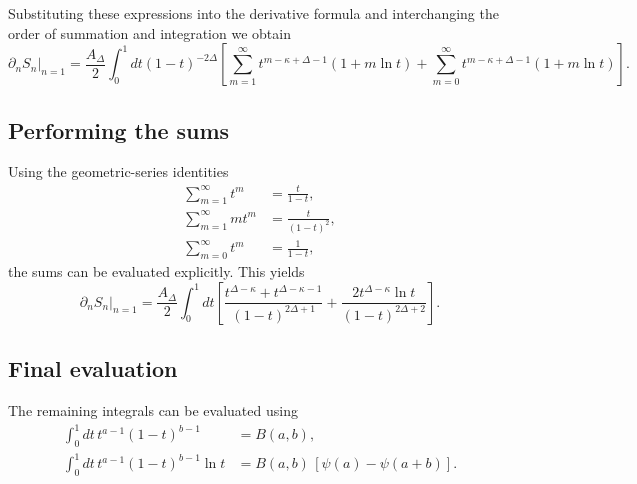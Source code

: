 \documentclass[11pt]{article}
\begin{document}
Substituting these expressions into the derivative formula and
interchanging the order of summation and integration we obtain
\begin{equation}
\partial_n S_n\big|_{n=1}=
\frac{A_\Delta}{2}\int_0^1 dt (1-t)^{-2\Delta}
\left[
\sum_{m=1}^\infty t^{m-\kappa+\Delta-1}(1+m\ln t)
+
\sum_{m=0}^\infty t^{m-\kappa+\Delta-1}(1+m\ln t)
\right].
\end{equation}

\subsection{Performing the sums}

Using the geometric-series identities
\begin{align}
\sum_{m=1}^\infty t^m &=\frac{t}{1-t},\\
\sum_{m=1}^\infty m t^m &=\frac{t}{(1-t)^2},\\
\sum_{m=0}^\infty t^m &=\frac{1}{1-t},
\end{align}
the sums can be evaluated explicitly.  This yields
\begin{equation}
\partial_n S_n\big|_{n=1}=
\frac{A_\Delta}{2}\int_0^1 dt
\left[
\frac{t^{\Delta-\kappa}+t^{\Delta-\kappa-1}}{(1-t)^{2\Delta+1}}
+
\frac{2t^{\Delta-\kappa}\ln t}{(1-t)^{2\Delta+2}}
\right].
\end{equation}

\subsection{Final evaluation}

The remaining integrals can be evaluated using
\begin{align}
\int_0^1 dt\, t^{a-1}(1-t)^{b-1}&=B(a,b),\\
\int_0^1 dt\, t^{a-1}(1-t)^{b-1}\ln t
&=B(a,b)\,[\psi(a)-\psi(a+b)].
\end{align}
\end{document}
